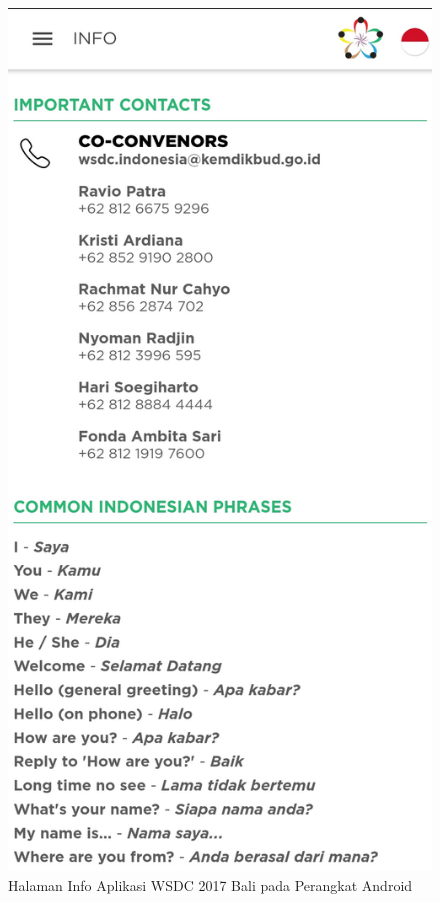 \begin{enumerate}
	\begin{figure}[H]
	    \centering
	    \includegraphics[scale=0.12]{Gambar/Info.jpg}
	    \caption{Halaman Info Aplikasi WSDC 2017 Bali pada Perangkat Android}
	    \label{fig:wsdcappinfo}
	\end{figure}
\end{enumerate}

